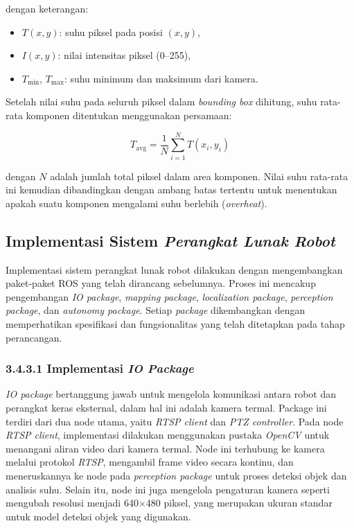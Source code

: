 \noindent
dengan keterangan:
\begin{itemize}
  \item \( T(x, y) \): suhu piksel pada posisi \((x, y)\),
  \item \( I(x, y) \): nilai intensitas piksel (0–255),
  \item \( T_{\text{min}} \), \( T_{\text{max}} \): suhu minimum dan maksimum dari kamera.
\end{itemize}

Setelah nilai suhu pada seluruh piksel dalam \emph{bounding box} dihitung, suhu rata-rata komponen ditentukan menggunakan persamaan:

\begin{equation}
T_{\text{avg}} = \frac{1}{N} \sum_{i=1}^{N} T(x_i, y_i)
\label{eq:rata-rata-suhu}
\end{equation}

\noindent
dengan \( N \) adalah jumlah total piksel dalam area komponen. Nilai suhu rata-rata ini kemudian dibandingkan dengan ambang batas tertentu untuk menentukan apakah suatu komponen mengalami suhu berlebih (\emph{overheat}).

\subsection{Implementasi Sistem \emph{Perangkat Lunak Robot}}
Implementasi sistem perangkat lunak robot dilakukan dengan mengembangkan paket-paket ROS yang telah dirancang sebelumnya. Proses ini mencakup pengembangan \emph{IO package}, \emph{mapping package}, \emph{localization package}, \emph{perception package}, dan \emph{autonomy package}. Setiap \emph{package} dikembangkan dengan memperhatikan spesifikasi dan fungsionalitas yang telah ditetapkan pada tahap perancangan.

\subsubsection{3.4.3.1 Implementasi \emph{IO Package}}

\emph{IO package} bertanggung jawab untuk mengelola komunikasi antara robot dan perangkat keras eksternal, dalam hal ini adalah kamera termal. Package ini terdiri dari dua node utama, yaitu \emph{RTSP client} dan \emph{PTZ controller}.  Pada node \emph{RTSP client}, implementasi dilakukan menggunakan pustaka \emph{OpenCV} untuk menangani aliran video dari kamera termal. Node ini terhubung ke kamera melalui protokol \emph{RTSP}, mengambil frame video secara kontinu, dan meneruskannya ke node pada \emph{perception package} untuk proses deteksi objek dan analisis suhu. Selain itu, node ini juga mengelola pengaturan kamera seperti mengubah resolusi menjadi 640$\times$480 piksel, yang merupakan ukuran standar untuk model deteksi objek yang digunakan.

